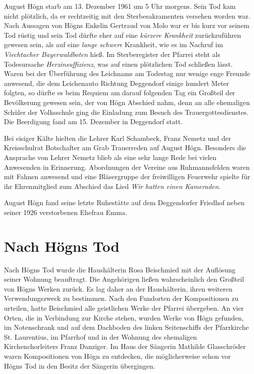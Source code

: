 \documentclass{book}
\newcommand{\zitat}[1]{\textit{#1}}
\begin{document}
August Högn starb am 13. Dezember 1961 um 5 Uhr morgens. Sein Tod kam
nicht plötzlich, da er rechtzeitig mit den Sterbesakramenten versehen
worden war. Nach Aussagen von Högns Enkelin Gertraud von Molo war er
bis kurz vor seinem Tod rüstig und sein Tod dürfte eher auf eine
\zitat{\textup{kürzere Krankheit}} zurückzuführen gewesen
sein, als auf eine \zitat{lange schwere} Krankheit, wie es im
Nachruf im \textit{Viechtacher Bayerwaldboten} hieß. Im Sterberegister
der Pfarrei steht als Todesursache \textit{Herzinsuffizienz}, was auf
einen plötzlichen Tod schließen lässt. Waren bei der Überführung des
Leichnams am Todestag nur wenige enge Freunde anwesend, die dem
Leichenauto Richtung Deggendorf einige hundert Meter folgten, so dürfte
es beim Requiem am darauf folgenden Tag ein Großteil der Bevölkerung
gewesen sein, der von Högn Abschied nahm, denn an alle ehemaligen
Schüler der Volksschule ging die Einladung zum Besuch des
Trauergottesdienstes. Die Beerdigung fand am 15. Dezember in Deggendorf
statt.

Bei eisiger Kälte hielten die Lehrer Karl Schambeck, Franz Nemetz und
der Kreisschulrat Botschafter am Grab Trauerreden auf August Högn.
Beson\-ders die Ansprache von Lehrer Nemetz blieb als eine sehr lange
Rede bei vie\-len Anwesenden in Erinnerung. Abordnungen der Vereine aus
Ruhmannsfel\-den waren mit Fahnen anwesend und eine Bläsergruppe der
freiwilligen Feu\-erwehr spielte für ihr Ehrenmitglied zum Abschied das
Lied \textit{Wir hatten einen Kameraden}.

August Högn fand seine letzte Ruhestätte auf dem Deggendorfer Friedhof
neben seiner 1926 verstorbenen Ehefrau Emma.

\section{Nach Högns Tod}
Nach Högns Tod wurde die Haushälterin Rosa Beischmied mit der Auflösung
seiner Wohnung beauftragt. Die Angehörigen ließen wahrscheinlich den
Großteil von Högns Werken zurück. Es lag daher an der Haushälterin,
ihren weiteren Verwendungszweck zu bestimmen. Nach den Fundorten der
Kom\-positionen zu urteilen, hatte Beischmied alle geistlichen Werke
der Pfarrei übergeben. An vier Orten, die in Verbindung zur Kirche
stehen, wurden Wer\-ke von Högn gefunden, im Notenschrank und auf dem
Dachboden des linken Seitenschiffs der Pfarrkirche St. Laurentius, im
Pfarrhof und in der Wohnung des ehemaligen Kirchenchorleiters Franz
Danziger. Im Haus der Sängerin Mathilde Glasschröder waren
Kompositionen von Högn zu entdecken, die möglicherweise schon vor Högns
Tod in den Besitz der Sängerin übergingen.
\end{document}
